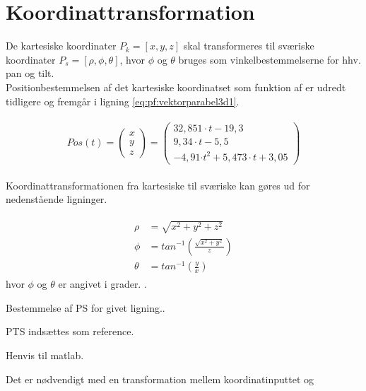 \section{Koordinattransformation}
\label{sec:koordinattransformation}

De kartesiske koordinater $P_k=[x, y, z]$ skal transformeres til sværiske koordinater $P_s=[\rho, \phi, \theta]$, hvor $\phi$ og $\theta$ bruges som vinkelbestemmelserne for hhv. pan og tilt.\\

Positionbestemmelsen af det kartesiske koordinatset som funktion af er udredt tidligere og fremgår i ligning \ref{eq:pf:vektorparabel3d1}. 

\begin{align}
\begin{split}
Pos\left( t \right) =\left( \begin{matrix} x \\ y \\ z \end{matrix} \right) =\left( \begin{matrix} 32,851\cdot t-19,3 \\ 9,34\cdot t-5,5 \\ -4,91{ \cdot t }^{ 2 }+5,473\cdot t+3,05 \end{matrix} \right) 
\label{eq:pf:vektorparabel3d1}
\end{split}
\end{align}

Koordinattransformationen fra kartesiske til sværiske kan gøres ud for nedenstående ligninger.


\begin{align}
\begin{split}
\rho &=\sqrt { { x }^{ 2 } +{ y }^{ 2 }+{ z }^{ 2 }} 
\\
\phi &={ tan }^{ -1 }\left( \frac { \sqrt { { x }^{ 2 }+{ y }^{ 2 } }  }{ z }  \right) 
\\
\theta &={ tan }^{ -1 }\left( \frac { y }{ x }  \right) 
\label{eq:sv_koordi}
\end{split}
\end{align}
hvor $\phi$ og $\theta$ er angivet i grader. \citep[Kap. 10.6, s. 598]{adam}.






\bigskip



Bestemmelse af PS for givet ligning..


PTS indsættes som reference. 

Henvis til matlab. 




Det er nødvendigt med en transformation mellem koordinatinputtet og 

